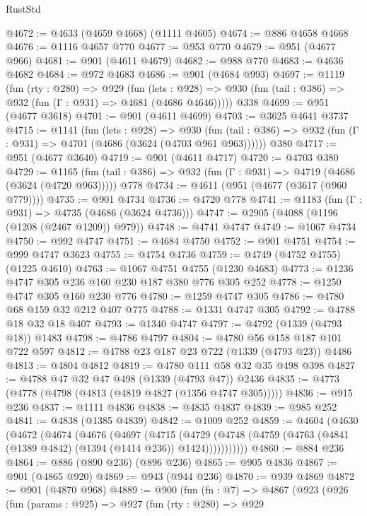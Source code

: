 \begin{lexlean}{RustStd}
\begin{coremodule}
{\begin{coremodule}
{{{{{{{{{{{{{{@4672 := @4633 (@4659 @4668) (@1111 @4605)
@4674 := @886 @4658 @4668
@4676 := @1116 @4657 @770
@4677 := @953 @770
@4679 := @951 (@4677 @966)
@4681 := @901 (@4611 @4679)
@4682 := @988 @770
@4683 := @4636 @4682
@4684 := @972 @4683
@4686 := @901 (@4684 @993)
@4697 := @1119
    (fun (rty : @280) =>
    @929
      (fun (lets : @928) =>
      @930 (fun (tail : @386) => @932 (fun (Γ : @931) => @4681 (@4686 @4646)))))
    @338
@4699 := @951 (@4677 @3618)
@4701 := @901 (@4611 @4699)
@4703 := @3625 @4641 @3737
@4715 := @1141
    (fun (lets : @928) =>
    @930 (fun (tail : @386) => @932 (fun (Γ : @931) => @4701 (@4686 (@3624 (@4703 @961 @963))))))
    @380
@4717 := @951 (@4677 @3640)
@4719 := @901 (@4611 @4717)
@4720 := @4703 @380
@4729 := @1165
    (fun (tail : @386) => @932 (fun (Γ : @931) => @4719 (@4686 (@3624 (@4720 @963)))))
    @778
@4734 := @4611 (@951 (@4677 (@3617 (@960 @779))))
@4735 := @901 @4734
@4736 := @4720 @778
@4741 := @1183 (fun (Γ : @931) => @4735 (@4686 (@3624 @4736)))
@4747 := @2905 (@4088 (@1196 (@1208 (@2467 @1209)) @979))
@4748 := @4741 @4747
@4749 := @1067 @4734
@4750 := @992 @4747
@4751 := @4684 @4750
@4752 := @901 @4751
@4754 := @999 @4747 @3623
@4755 := @4754 @4736
@4759 := @4749 (@4752 @4755) (@1225 @4610)
@4763 := @1067 @4751 @4755 (@1230 @4683)
@4773 := @1236 @4747 @305 @236 @160 @230 @187 @380 @776 @305 @252
@4778 := @1250 @4747 @305 @160 @230 @776
@4780 := @1259 @4747 @305
@4786 := @4780 @68 @159 @32 @212 @407 @775
@4788 := @1331 @4747 @305
@4792 := @4788 @18 @32 @18 @407
@4793 := @1340 @4747
@4797 := @4792 (@1339 (@4793 @18)) @1483
@4798 := @4786 @4797
@4804 := @4780 @56 @158 @187 @101 @722 @597
@4812 := @4788 @23 @187 @23 @722 (@1339 (@4793 @23)) @4486
@4813 := @4804 @4812
@4819 := @4780 @111 @58 @32 @35 @498 @398
@4827 := @4788 @47 @32 @47 @498 (@1339 (@4793 @47)) @2436
@4835 := @4773 (@4778 (@4798 (@4813 (@4819 @4827 (@1356 @4747 @305)))))
@4836 := @915 @236
@4837 := @1111 @4836
@4838 := @4835 @4837
@4839 := @985 @252
@4841 := @4838 (@1385 @4839)
@4842 := @1009 @252
@4859 := @4604
    (@4630
      (@4672
        (@4674
          (@4676
            (@4697
              (@4715
                (@4729
                  (@4748 (@4759 (@4763 (@4841 (@1389 @4842) (@1394 (@1414 @236)) @1424)))))))))))
@4860 := @884 @236
@4864 := @886 (@890 @236) (@896 @236)
@4865 := @905 @4836
@4867 := @901 (@4865 @920)
@4869 := @943 (@944 @236)
@4870 := @939 @4869
@4872 := @901 (@4870 @968)
@4889 := @900
    (fun (fn : @7) =>
    @4867
      (@923
        (@926
          (fun (params : @925) =>
          @927
            (fun (rty : @280) =>
            @929
}}}}}}}}}}}}}}
\end{coremodule}}
\end{coremodule}
\end{lexlean}
